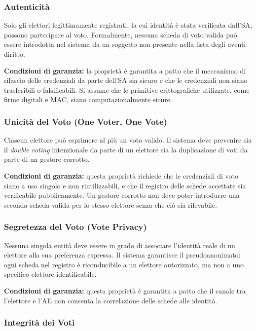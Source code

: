 \documentclass[12pt,a4paper]{article}
\begin{document}
\subsubsection{Autenticità}

Solo gli elettori legittimamente registrati, la cui identità è stata verificata dall'SA,
possono partecipare al voto. Formalmente, nessuna scheda di voto valida può essere introdotta
nel sistema da un soggetto non presente nella lista degli aventi diritto.

\textbf{Condizioni di garanzia:} la proprietà è garantita a patto che il meccanismo di rilascio
delle credenziali da parte dell'SA sia sicuro e che le credenziali non siano trasferibili o
falsificabili. Si assume che le primitive crittografiche utilizzate, come firme digitali e MAC,
siano computazionalmente sicure.

\subsubsection{Unicità del Voto (One Voter, One Vote)}

Ciascun elettore può esprimere al più un voto valido. Il sistema deve prevenire sia il
\textit{double voting} intenzionale da parte di un elettore sia la duplicazione di voti da
parte di un gestore corrotto.

\textbf{Condizioni di garanzia:} questa proprietà richiede che le credenziali di voto siano a
uso singolo e non riutilizzabili, e che il registro delle schede accettate sia verificabile
pubblicamente. Un gestore corrotto non deve poter introdurre una seconda scheda valida per lo
stesso elettore senza che ciò sia rilevabile.

\subsubsection{Segretezza del Voto (Vote Privacy)}

Nessuna singola entità deve essere in grado di associare l'identità reale di un elettore alla
sua preferenza espressa. Il sistema garantisce il pseudoanonimato: ogni scheda nel registro è
riconducibile a un elettore autorizzato, ma non a uno specifico elettore identificabile.

\textbf{Condizioni di garanzia:} questa proprietà è garantita a patto che il canale tra
l'elettore e l'AE non consenta la correlazione delle schede alle identità.

\subsubsection{Integrità dei Voti}
\end{document}
